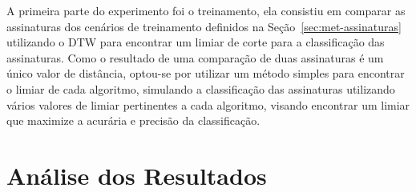A primeira parte do experimento foi o treinamento, ela consistiu em comparar as assinaturas dos cenários de treinamento definidos na Seção~\ref{sec:met-assinaturas} utilizando o DTW para encontrar um limiar de corte para a classificação das assinaturas. Como o resultado de uma comparação de duas assinaturas é um único valor de distância, optou-se por utilizar um método simples para encontrar o limiar de cada algoritmo, simulando a classificação das assinaturas utilizando vários valores de limiar pertinentes a cada algoritmo, visando encontrar um limiar que maximize a acurária e precisão da classificação.


\section{Análise dos Resultados}
\label{sec:met-analise}











